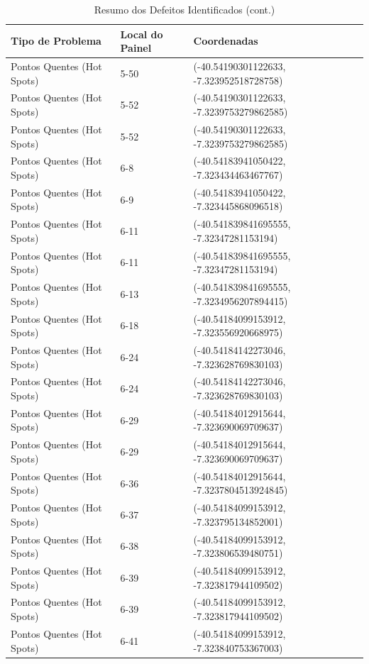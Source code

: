\documentclass[dvipsnames]{article}%
\begin{document}
\begin{table}[h!]%
\caption{Resumo dos Defeitos Identificados (cont.)}%
\begin{tabular}{lll}%
\toprule%
Tipo de Problema&Local do Painel&Coordenadas\\%
\midrule%
Pontos Quentes (Hot Spots)&5{-}50&({-}40.54190301122633, {-}7.323952518728758)\\%
Pontos Quentes (Hot Spots)&5{-}52&({-}40.54190301122633, {-}7.3239753279862585)\\%
Pontos Quentes (Hot Spots)&5{-}52&({-}40.54190301122633, {-}7.3239753279862585)\\%
Pontos Quentes (Hot Spots)&6{-}8&({-}40.54183941050422, {-}7.323434463467767)\\%
Pontos Quentes (Hot Spots)&6{-}9&({-}40.54183941050422, {-}7.323445868096518)\\%
Pontos Quentes (Hot Spots)&6{-}11&({-}40.541839841695555, {-}7.32347281153194)\\%
Pontos Quentes (Hot Spots)&6{-}11&({-}40.541839841695555, {-}7.32347281153194)\\%
Pontos Quentes (Hot Spots)&6{-}13&({-}40.541839841695555, {-}7.3234956207894415)\\%
Pontos Quentes (Hot Spots)&6{-}18&({-}40.54184099153912, {-}7.323556920668975)\\%
Pontos Quentes (Hot Spots)&6{-}24&({-}40.54184142273046, {-}7.323628769830103)\\%
Pontos Quentes (Hot Spots)&6{-}24&({-}40.54184142273046, {-}7.323628769830103)\\%
Pontos Quentes (Hot Spots)&6{-}29&({-}40.54184012915644, {-}7.323690069709637)\\%
Pontos Quentes (Hot Spots)&6{-}29&({-}40.54184012915644, {-}7.323690069709637)\\%
Pontos Quentes (Hot Spots)&6{-}36&({-}40.54184012915644, {-}7.3237804513924845)\\%
Pontos Quentes (Hot Spots)&6{-}37&({-}40.54184099153912, {-}7.323795134852001)\\%
Pontos Quentes (Hot Spots)&6{-}38&({-}40.54184099153912, {-}7.323806539480751)\\%
Pontos Quentes (Hot Spots)&6{-}39&({-}40.54184099153912, {-}7.323817944109502)\\%
Pontos Quentes (Hot Spots)&6{-}39&({-}40.54184099153912, {-}7.323817944109502)\\%
Pontos Quentes (Hot Spots)&6{-}41&({-}40.54184099153912, {-}7.323840753367003)\\%

\end{tabular}
\end{table}
\end{document}
